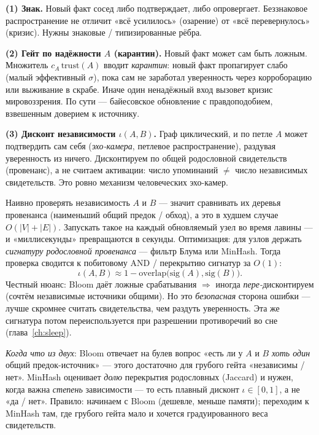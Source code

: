 \smallskip\noindent\textbf{(1) Знак.}
Новый факт сосед либо подтверждает, либо опровергает. Беззнаковое
распространение не отличит «всё усилилось» (озарение) от «всё перевернулось»
(кризис). Нужны знаковые / типизированные рёбра.

\smallskip\noindent\textbf{(2) Гейт по надёжности $A$ (карантин).}
Новый факт может сам быть ложным. Множитель $c_A\,\mathrm{trust}(A)$ вводит
\emph{карантин}: новый факт пропагирует слабо (малый эффективный $\sigma$),
пока сам не заработал уверенность через корроборацию или выживание в скрабе.
Иначе один ненадёжный вход вызовет кризис мировоззрения. По сути ---
байесовское обновление с правдоподобием, взвешенным доверием к источнику.

\smallskip\noindent\textbf{(3) Дисконт независимости $\iota(A,B)$.}
Граф циклический, и по петле $A$ может подтвердить сам себя
(\textit{эхо-камера}, петлевое распространение), раздувая уверенность из
ничего. Дисконтируем по общей родословной свидетельств (провенанс), а не
считаем активации: число упоминаний $\ne$ число независимых свидетельств. Это
ровно механизм человеческих эхо-камер.

\begin{pitfall}
Наивно проверять независимость $A$ и $B$ --- значит сравнивать их деревья
провенанса (наименьший общий предок / обход), а это в худшем случае
$O(|V|+|E|)$. Запускать такое на каждый обновляемый узел во время лавины --- и
«миллисекунды» превращаются в секунды. Оптимизация: для узлов держать
\emph{сигнатуру родословной провенанса} --- фильтр Блума или MinHash. Тогда
проверка сводится к побитовому AND / перекрытию сигнатур за $O(1)$:
\[
\iota(A,B) \approx 1 - \mathrm{overlap}\bigl(\mathrm{sig}(A), \mathrm{sig}(B)\bigr).
\]
Честный нюанс: Bloom даёт ложные срабатывания $\Rightarrow$ иногда
\emph{пере-}дисконтируем (сочтём независимые источники общими). Но это
\emph{безопасная} сторона ошибки --- лучше скромнее считать свидетельства, чем
раздуть уверенность. Эта же сигнатура потом переиспользуется при разрешении
противоречий во сне (глава~\ref{ch:sleep}).

\emph{Когда что из двух}: Bloom отвечает на булев вопрос «есть ли у $A$ и $B$
\emph{хоть один} общий предок-источник» --- этого достаточно для грубого
гейта «независимы / нет». MinHash оценивает \emph{долю} перекрытия родословных
(Jaccard) и нужен, когда важна \emph{степень} зависимости --- то есть плавный
дисконт $\iota \in [0,1]$, а не «да / нет». Правило: начинаем с Bloom
(дешевле, меньше памяти); переходим к MinHash там, где грубого гейта мало и
хочется градуированного веса свидетельств.
\end{pitfall}

